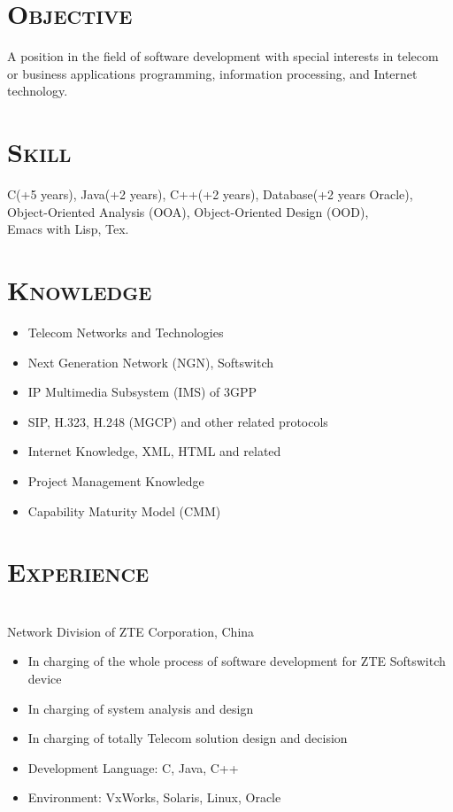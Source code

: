 \documentclass[margin,12pt]{res}
\begin{document}
\begin{resume}
 
\section{\textsc{Objective}}  A position in the field of software development with special 
                interests in telecom or business applications programming, 
                information processing, and Internet technology. 

\section{\textsc{Skill}} 
                C(+5 years), Java(+2 years), C++(+2 years), Database(+2 years Oracle),\\
                Object-Oriented Analysis (OOA),  Object-Oriented Design (OOD),\\
                Emacs with Lisp, Tex.

\section{\textsc{Knowledge}} 
\begin{itemize}
    \item Telecom Networks and Technologies
    \item Next Generation Network (NGN), Softswitch
    \item IP Multimedia Subsystem (IMS) of 3GPP
    \item SIP, H.323, H.248 (MGCP) and other related protocols
    \item Internet Knowledge, XML, HTML and related
    \item Project Management Knowledge
    \item Capability Maturity Model (CMM)
\end{itemize}
 
\section{\textsc{Experience}} 
 \\
Network Division of ZTE Corporation, China

\begin{itemize} \itemsep -2pt %
    \item In charging of the whole process of software development for ZTE Softswitch device
    \item In charging of system analysis and design
    \item In charging of totally Telecom solution design and decision
    \item Development Language: C, Java, C++
    \item Environment: VxWorks, Solaris, Linux, Oracle


\end{itemize}
\end{resume}
\end{document}
